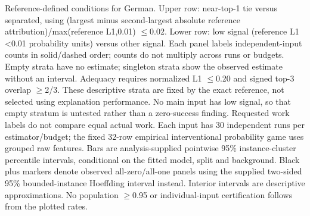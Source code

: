 Reference-defined conditions for German. Upper row: near-top-1 tie versus separated, using (largest minus second-largest absolute reference attribution)/max(reference L1,0.01) $\leq$0.02. Lower row: low signal (reference L1 <0.01 probability units) versus other signal. Each panel labels independent-input counts in solid/dashed order; counts do not multiply across runs or budgets. Empty strata have no estimate; singleton strata show the observed estimate without an interval. Adequacy requires normalized L1 $\leq$0.20 and signed top-3 overlap $\geq$2/3. These descriptive strata are fixed by the exact reference, not selected using explanation performance. No main input has low signal, so that empty stratum is untested rather than a zero-success finding. Requested work labels do not compare equal actual work. Each input has 30 independent runs per estimator/budget; the fixed 32-row empirical interventional probability game uses grouped raw features. Bars are analysis-supplied pointwise 95\% instance-cluster percentile intervals, conditional on the fitted model, split and background. Black plus markers denote observed all-zero/all-one panels using the supplied two-sided 95\% bounded-instance Hoeffding interval instead. Interior intervals are descriptive approximations. No population $\geq$0.95 or individual-input certification follows from the plotted rates.
